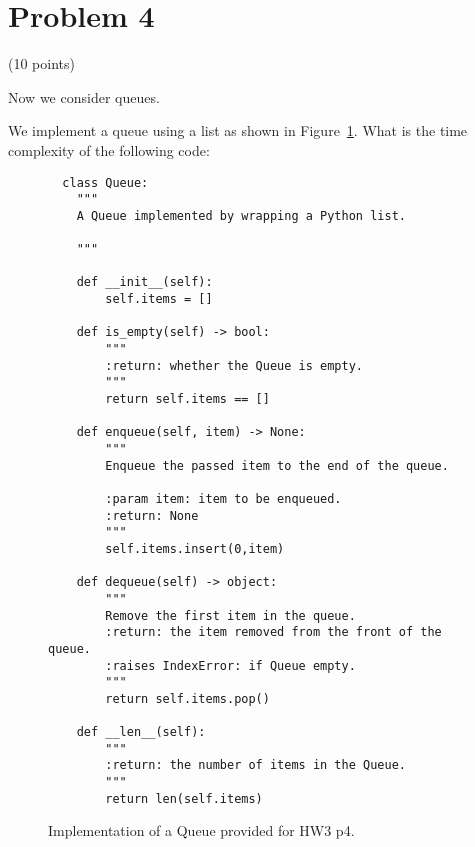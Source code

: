 \documentclass{article}
\begin{document}
\section{Problem 4} (10 points)

Now we consider queues.

We implement a queue using a list as shown in Figure~\ref{fig:queue}.
What is the time complexity of the following code:

\begin{figure}
\begin{verbatim}
  class Queue:
    """
    A Queue implemented by wrapping a Python list.

    """

    def __init__(self):
        self.items = []

    def is_empty(self) -> bool:
        """
        :return: whether the Queue is empty.
        """
        return self.items == []

    def enqueue(self, item) -> None:
        """
        Enqueue the passed item to the end of the queue.

        :param item: item to be enqueued.
        :return: None
        """
        self.items.insert(0,item)

    def dequeue(self) -> object:
        """
        Remove the first item in the queue.
        :return: the item removed from the front of the queue.
        :raises IndexError: if Queue empty.
        """
        return self.items.pop()

    def __len__(self):
        """
        :return: the number of items in the Queue.
        """
        return len(self.items)

\end{verbatim}
\caption{Implementation of a Queue provided for HW3 p4.}\label{fig:queue}

\end{figure}
\end{document}
